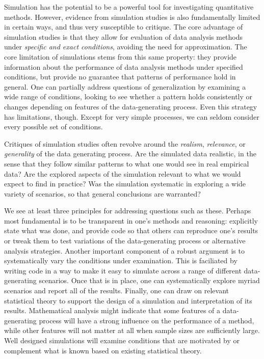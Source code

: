 \documentclass[
]{book}
\begin{document}
Simulation has the potential to be a powerful tool for investigating quantitative methods.
However, evidence from simulation studies is also fundamentally limited in certain ways, and thus very susceptible to critique.
The core advantage of simulation studies is that they allow for evaluation of data analysis methods under \emph{specific and exact conditions}, avoiding the need for approximation.
The core limitation of simulations stems from this same property: they provide information about the performance of data analysis methods under specified conditions, but provide no guarantee that patterns of performance hold in general.
One can partially address questions of generalization by examining a wide range of conditions, looking to see whether a pattern holds consistently or changes depending on features of the data-generating process.
Even this strategy has limitations, though.
Except for very simple processes, we can seldom consider every possible set of conditions.

Critiques of simulation studies often revolve around the \emph{realism}, \emph{relevance}, or \emph{generality} of the data generating process.
Are the simulated data realistic, in the sense that they follow similar patterns to what one would see in real empirical data?
Are the explored aspects of the simulation relevant to what we would expect to find in practice?
Was the simulation systematic in exploring a wide variety of scenarios, so that general conclusions are warranted?

We see at least three principles for addressing questions such as these.
Perhaps most fundamental is to be transparent in one's methods and reasoning:
explicitly state what was done, and provide code so that others can reproduce one's results or tweak them to test variations of the data-generating process or alternative analysis strategies.
Another important component of a robust argument is to systematically vary the conditions under examination. This is faciliated by writing code in a way to make it easy to simulate across a range of different data-generating scenarios.
Once that is in place, one can systematically explore myriad scenarios and report all of the results.
Finally, one can draw on relevant statistical theory to support the design of a simulation and interpretation of its results.
Mathematical analysis might indicate that some features of a data-generating process will have a strong influence on the performance of a method, while other features will not matter at all when sample sizes are sufficiently large.
Well designed simulations will examine conditions that are motivated by or complement what is known based on existing statistical theory.
\end{document}
